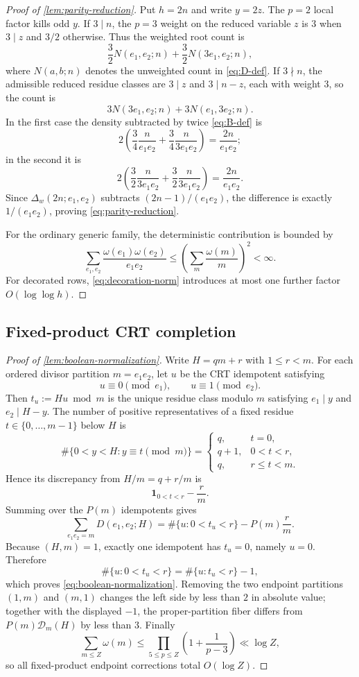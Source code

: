 \documentclass[11pt]{article}
\theoremstyle{definition}
\theoremstyle{remark}
\newcommand{\Dcal}{\mathcal D}
\newcommand{\1}{\mathbf 1}
\newcommand{\om}{\omega}
\begin{document}
\begin{proof}[Proof of \cref{lem:parity-reduction}]
Put $h=2n$ and write $y=2z$.  The $p=2$ local factor kills odd $y$.  If $3\mid n$, the $p=3$ weight on the reduced variable $z$ is $3$ when $3\mid z$ and $3/2$ otherwise.  Thus the weighted root count is
\[
\frac32N(e_1,e_2;n)+\frac32N(3e_1,e_2;n),
\]
where $N(a,b;n)$ denotes the unweighted count in \cref{eq:D-def}.  If $3\nmid n$, the admissible reduced residue classes are $3\mid z$ and $3\mid n-z$, each with weight $3$, so the count is
\[
3N(3e_1,e_2;n)+3N(e_1,3e_2;n).
\]
In the first case the density subtracted by twice \cref{eq:B-def} is
\[
2\left(\frac34\frac{n}{e_1e_2}+\frac34\frac{n}{3e_1e_2}\right)
=\frac{2n}{e_1e_2};
\]
in the second it is
\[
2\left(\frac32\frac{n}{3e_1e_2}+\frac32\frac{n}{3e_1e_2}\right)
=\frac{2n}{e_1e_2}.
\]
Since $\Delta_w(2n;e_1,e_2)$ subtracts $(2n-1)/(e_1e_2)$, the difference is exactly $1/(e_1e_2)$, proving \cref{eq:parity-reduction}.

For the ordinary generic family, the deterministic contribution is bounded by
\[
\sum_{e_1,e_2}\frac{\om(e_1)\om(e_2)}{e_1e_2}
\le\left(\sum_m\frac{\om(m)}m\right)^2<\infty.
\]
For decorated rows, \cref{eq:decoration-norm} introduces at most one further factor $O(\log\log h)$.
\end{proof}

\subsection{Fixed-product CRT completion}

\begin{proof}[Proof of \cref{lem:boolean-normalization}]
Write $H=qm+r$ with $1\le r<m$.  For each ordered divisor partition $m=e_1e_2$, let $u$ be the CRT idempotent satisfying
\[
u\equiv0\pmod{e_1},\qquad u\equiv1\pmod{e_2}.
\]
Then $t_u:=Hu\bmod m$ is the unique residue class modulo $m$ satisfying $e_1\mid y$ and $e_2\mid H-y$.  The number of positive representatives of a fixed residue $t\in\{0,\dots,m-1\}$ below $H$ is
\[
\#\{0<y<H:y\equiv t\pmod m\}
=\begin{cases}
q,&t=0,\\
q+1,&0<t<r,\\
q,&r\le t<m.
\end{cases}
\]
Hence its discrepancy from $H/m=q+r/m$ is
\[
\mathbf1_{0<t<r}-\frac rm.
\]
Summing over the $P(m)$ idempotents gives
\[
\sum_{e_1e_2=m}D(e_1,e_2;H)
=\#\{u:0<t_u<r\}-P(m)\frac rm.
\]
Because $(H,m)=1$, exactly one idempotent has $t_u=0$, namely $u=0$.  Therefore
\[
\#\{u:0<t_u<r\}=\#\{u:t_u<r\}-1,
\]
which proves \cref{eq:boolean-normalization}.  Removing the two endpoint partitions $(1,m)$ and $(m,1)$ changes the left side by less than $2$ in absolute value; together with the displayed $-1$, the proper-partition fiber differs from $P(m)\Dcal_m(H)$ by less than $3$.  Finally
\[
\sum_{m\le Z}\om(m)
\le\prod_{5\le p\le Z}\left(1+\frac1{p-3}\right)
\ll\log Z,
\]
so all fixed-product endpoint corrections total $O(\log Z)$.
\end{proof}
\end{document}
